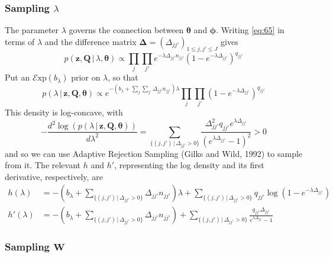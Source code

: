 \documentclass[12pt,letterpaper]{report}
\newcommand{\Exp}[1]{\mathcal{E}\mathrm{xp}(#1)}
\newcommand{\given}{\, \vert \,}
\newcommand{\bQ}{\mathbf{Q}}
\newcommand{\bz}{\mathbf{z}}
\newcommand{\bW}{\mathbf{W}}
\newcommand{\btheta}{\boldsymbol{\theta}}
\newcommand{\bphi}{\boldsymbol{\phi}}
\begin{document}
\subsubsection{Sampling $\lambda$}
\label{sec:sampling-lambda}

The parameter $\lambda$ governs the connection between $\btheta$ and
$\bphi$.  Writing \eqref{eq:65} in terms of $\lambda$ and the difference matrix
$\boldsymbol{\Delta} = (\Delta_{jj'})_{1 \leq j,j' \leq J}$ gives
\begin{equation}
  \label{eq:88}
  p(\bz, \bQ \given \lambda, \btheta) \propto \prod_{j}\prod_{j'}
  e^{-\lambda \Delta_{jj'} n_{jj'}}(1-e^{-\lambda\Delta_{jj'}})^{q_{jj'}} 
\end{equation}
Put an $\Exp{b_{\lambda}}$ prior on $\lambda$, so that
\begin{equation}
  \label{eq:88}
  p(\lambda \given \bz, \bQ, \btheta) \propto
  e^{-(b_{\lambda} + \sum_{j}\sum_{j'} \Delta_{jj'} n_{jj'})\lambda} \prod_{j}\prod_{j'}
  (1-e^{-\lambda\Delta_{jj'}})^{q_{jj'}}
\end{equation}
This density is log-concave, with
\begin{equation}
  \label{eq:90}
  -\frac{d^2\log(p(\lambda \given \bz, \bQ,
    \btheta))}{d\lambda^2} = \sum_{\{(j,j') \given
    \Delta_{jj'} > 0\}}
  \frac{\Delta_{jj'}^2 q_{jj'}
    e^{\lambda\Delta_{jj'}}}{(e^{\lambda\Delta_{jj'}} - 1)^2} > 0
\end{equation}
and so we can use Adaptive Rejection Sampling (Gilks and Wild, 1992)
to sample from it.  The relevant $h$ and $h'$, representing the log
density and its first derivative, respectively, are
\begin{align}
  \label{eq:94}
  h(\lambda) &= 
  -(b_{\lambda} + \sum_{\{(j,j') \given \Delta_{jj'} > 0\}} \Delta_{jj'} n_{jj'})\lambda +
  \sum_{\{(j,j') \given \Delta_{jj'} > 0\}} q_{jj'} \log(1 - e^{-\lambda\Delta_{jj'}}) \\
  h'(\lambda) &= -(b_{\lambda} + \sum_{\{(j,j') \given \Delta_{jj'} > 0\}} \Delta_{jj'}
  n_{jj'}) + \sum_{\{(j,j') \given \Delta_{jj'} > 0\}}
  \frac{q_{jj'}\Delta_{jj'}}{e^{\lambda\Delta_{jj'}} - 1}
\end{align}

\subsubsection{Sampling $\bW$}
\end{document}

